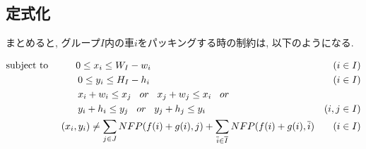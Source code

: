 \subsection{定式化}
まとめると, グループ$I$内の車$i$をパッキングする時の制約は, 以下のようになる. 
\begin{center}  
\begin{align}
    & \textrm{subject\ to} \hspace{1cm}0 \leq x_i \leq W_I - w_i & (i \in I)\\
    & \hspace{2.6cm} 0 \leq y_i \leq H_I - h_i & (i \in I)\\
    & \hspace{2.6cm} x_i + w_i \leq x_j \hspace{0.3cm}or\hspace{0.3cm} x_j + w_j \leq x_i \hspace{0.3cm}or \nonumber \\
    & \hspace{2.6cm} y_i + h_i \leq y_j \hspace{0.3cm}or\hspace{0.3cm} y_j + h_j \leq y_i &(i,j \in I)\\
    & \hspace{2cm} (x_i, y_i) \neq \sum_{j \in J} NFP(f(i)+g(i),j) + \sum_{\overline{i} \in \overline{I}}NFP(f(i)+g(i),\overline{i}) & (i \in I)
\end{align}
\end{center}